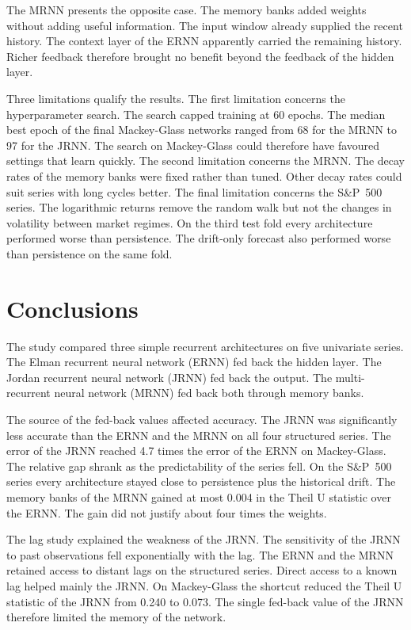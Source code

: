 \documentclass[conference,10pt]{IEEEtran}
\begin{document}
The MRNN presents the opposite case.
The memory banks added weights without adding useful information.
The input window already supplied the recent history.
The context layer of the ERNN apparently carried the remaining history.
Richer feedback therefore brought no benefit beyond the feedback of the
hidden layer.

Three limitations qualify the results.
The first limitation concerns the hyperparameter search.
The search capped training at 60 epochs.
The median best epoch of the final Mackey-Glass networks ranged from 68
for the MRNN to 97 for the JRNN.
The search on Mackey-Glass could therefore have favoured settings that
learn quickly.
The second limitation concerns the MRNN.
The decay rates of the memory banks were fixed rather than tuned.
Other decay rates could suit series with long cycles better.
The final limitation concerns the S\&P~500 series.
The logarithmic returns remove the random walk but not the changes in
volatility between market regimes.
On the third test fold every architecture performed worse than
persistence.
The drift-only forecast also performed worse than persistence on the
same fold.

\section{Conclusions}
\label{sec:conclusions}
The study compared three simple recurrent architectures on five
univariate series.
The Elman recurrent neural network (ERNN) fed back the hidden layer.
The Jordan recurrent neural network (JRNN) fed back the output.
The multi-recurrent neural network (MRNN) fed back both through memory
banks.

The source of the fed-back values affected accuracy.
The JRNN was significantly less accurate than the ERNN and the MRNN on
all four structured series.
The error of the JRNN reached 4.7 times the error of the ERNN on
Mackey-Glass.
The relative gap shrank as the predictability of the series fell.
On the S\&P~500 series every architecture stayed close to persistence
plus the historical drift.
The memory banks of the MRNN gained at most 0.004 in the Theil U
statistic over the ERNN.
The gain did not justify about four times the weights.

The lag study explained the weakness of the JRNN.
The sensitivity of the JRNN to past observations fell exponentially
with the lag.
The ERNN and the MRNN retained access to distant lags on the structured
series.
Direct access to a known lag helped mainly the JRNN.
On Mackey-Glass the shortcut reduced the Theil U statistic of the JRNN
from 0.240 to 0.073.
The single fed-back value of the JRNN therefore limited the memory of
the network.
\end{document}
